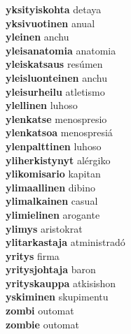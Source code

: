 \textbf{yksityiskohta } detaya \\
\textbf{yksivuotinen } anual \\
\textbf{yleinen } anchu \\
\textbf{yleisanatomia } anatomia \\
\textbf{yleiskatsaus } resúmen \\
\textbf{yleisluonteinen } anchu \\
\textbf{yleisurheilu } atletismo \\
\textbf{ylellinen } luhoso \\
\textbf{ylenkatse } menospresio \\
\textbf{ylenkatsoa } menospresiá \\
\textbf{ylenpalttinen } luhoso \\
\textbf{yliherkistynyt } alérgiko \\
\textbf{ylikomisario } kapitan \\
\textbf{ylimaallinen } dibino \\
\textbf{ylimalkainen } casual \\
\textbf{ylimielinen } arogante \\
\textbf{ylimys } aristokrat \\
\textbf{ylitarkastaja } atministradó \\
\textbf{yritys } firma \\
\textbf{yritysjohtaja } baron \\
\textbf{yrityskauppa } atkisishon \\
\textbf{yskiminen } skupimentu \\
\textbf{zombi } outomat \\
\textbf{zombie } outomat \\
